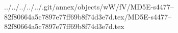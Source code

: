 ../../../../../.git/annex/objects/wW/fV/MD5E-s4477--82f80664a5c7897e77ff69b8f74d3e7d.tex/MD5E-s4477--82f80664a5c7897e77ff69b8f74d3e7d.tex